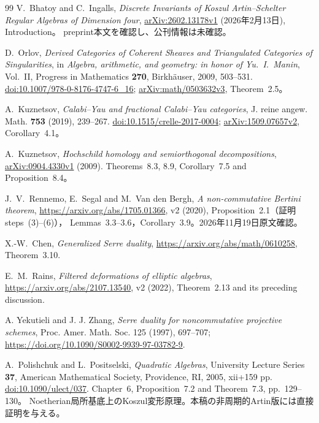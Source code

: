 \documentclass[11pt,a4paper]{ltjsarticle}
\numberwithin{equation}{section}
\begin{document}
\begin{thebibliography}{99}
V.~Bhatoy and C.~Ingalls,
\emph{Discrete Invariants of Koszul Artin--Schelter Regular Algebras of Dimension four},
\href{https://arxiv.org/abs/2602.13178v1}{arXiv:2602.13178v1}
(2026年2月13日), Introduction。
preprint本文を確認し、公刊情報は未確認。

D.~Orlov,
\emph{Derived Categories of Coherent Sheaves and Triangulated Categories of Singularities},
in \emph{Algebra, arithmetic, and geometry: in honor of Yu.~I.~Manin},
Vol.~II, Progress in Mathematics \textbf{270}, Birkh\"auser, 2009, 503--531.
\href{https://doi.org/10.1007/978-0-8176-4747-6_16}{doi:10.1007/978-0-8176-4747-6\_16};
\href{https://arxiv.org/abs/math/0503632v3}{arXiv:math/0503632v3},
Theorem~2.5。

A.~Kuznetsov,
\emph{Calabi--Yau and fractional Calabi--Yau categories},
J. reine angew. Math. \textbf{753} (2019), 239--267.
\href{https://doi.org/10.1515/crelle-2017-0004}{doi:10.1515/crelle-2017-0004};
\href{https://arxiv.org/abs/1509.07657v2}{arXiv:1509.07657v2},
Corollary~4.1。

A.~Kuznetsov,
\emph{Hochschild homology and semiorthogonal decompositions},
\href{https://arxiv.org/abs/0904.4330v1}{arXiv:0904.4330v1} (2009).
Theorems~8.3, 8.9, Corollary~7.5 and Proposition~8.4。

J.~V.~Rennemo, E.~Segal and M.~Van den Bergh,
\emph{A non-commutative Bertini theorem},
\url{https://arxiv.org/abs/1705.01366}, v2 (2020), Proposition~2.1（証明steps~(3)--(6)），
Lemmas~3.3--3.6，Corollary~3.9。2026年11月19日原文確認。

X.-W.~Chen, \emph{Generalized Serre duality},
\url{https://arxiv.org/abs/math/0610258}, Theorem~3.10.

E.~M.~Rains, \emph{Filtered deformations of elliptic algebras},
\url{https://arxiv.org/abs/2107.13540}, v2 (2022), Theorem~2.13 and its preceding discussion.

A. Yekutieli and J. J. Zhang,
\emph{Serre duality for noncommutative projective schemes},
Proc. Amer. Math. Soc. 125 (1997), 697--707;
\url{https://doi.org/10.1090/S0002-9939-97-03782-9}.

A.~Polishchuk and L.~Positselski,
\emph{Quadratic Algebras}, University Lecture Series \textbf{37},
American Mathematical Society, Providence, RI, 2005, xii+159 pp.
\href{https://doi.org/10.1090/ulect/037}{doi:10.1090/ulect/037}.
Chapter~6, Proposition~7.2 and Theorem~7.3, pp.~129--130。
Noetherian局所基底上のKoszul変形原理。本稿の非周期的Artin版には直接証明を与える。



\end{thebibliography}
\end{document}

